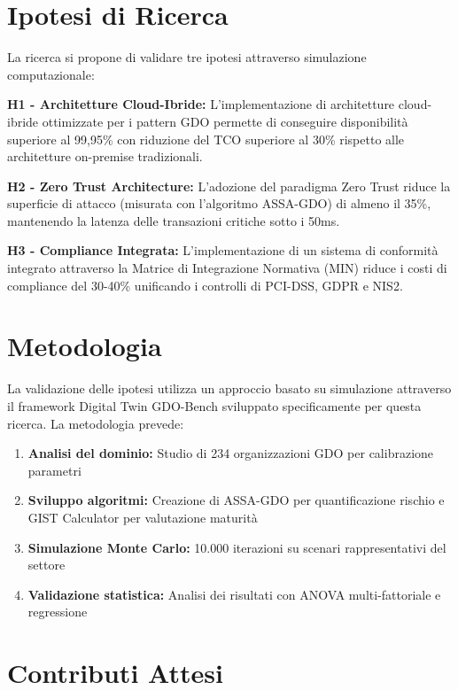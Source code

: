 \documentclass[12pt,a4paper,twoside]{book}
\begin{document}
\section{Ipotesi di Ricerca}
\label{sec:ipotesi}

La ricerca si propone di validare tre ipotesi attraverso simulazione computazionale:

\textbf{H1 - Architetture Cloud-Ibride:} L'implementazione di architetture cloud-ibride ottimizzate per i pattern GDO permette di conseguire disponibilità superiore al 99,95\% con riduzione del TCO superiore al 30\% rispetto alle architetture on-premise tradizionali.

\textbf{H2 - Zero Trust Architecture:} L'adozione del paradigma Zero Trust riduce la superficie di attacco (misurata con l'algoritmo ASSA-GDO) di almeno il 35\%, mantenendo la latenza delle transazioni critiche sotto i 50ms.

\textbf{H3 - Compliance Integrata:} L'implementazione di un sistema di conformità integrato attraverso la Matrice di Integrazione Normativa (MIN) riduce i costi di compliance del 30-40\% unificando i controlli di PCI-DSS, GDPR e NIS2.

\section{Metodologia}
\label{sec:metodologia}

La validazione delle ipotesi utilizza un approccio basato su simulazione attraverso il framework Digital Twin GDO-Bench sviluppato specificamente per questa ricerca. La metodologia prevede:

\begin{enumerate}
\item \textbf{Analisi del dominio:} Studio di 234 organizzazioni GDO per calibrazione parametri
\item \textbf{Sviluppo algoritmi:} Creazione di ASSA-GDO per quantificazione rischio e GIST Calculator per valutazione maturità
\item \textbf{Simulazione Monte Carlo:} 10.000 iterazioni su scenari rappresentativi del settore
\item \textbf{Validazione statistica:} Analisi dei risultati con ANOVA multi-fattoriale e regressione
\end{enumerate}

\section{Contributi Attesi}
\label{sec:contributi}
\end{document}
